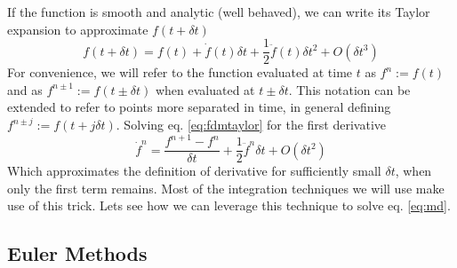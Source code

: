 \documentclass[ twoside,openright,titlepage,numbers=noenddot,%
headinclude,footinclude,cleardoublepage=empty,abstract=on,
BCOR=5mm,paper=a4,fontsize=11pt, dvipsnames
]{scrreprt}
\newcommand{\dt}{\delta t}
\newcommand{\half}{\frac{1}{2}}
\begin{document}
If the function is smooth and analytic (well behaved), we can write its Taylor expansion to approximate $f(t+\dt)$
\begin{equation}
  \label{eq:fdmtaylor}
  f(t+\dt) = f(t)+\dot{f}(t)\dt + \half\ddot{f}(t)\dt^2 + O(\dt^3)
\end{equation}
For convenience, we will refer to the function evaluated at time $t$ as $f^n := f(t)$ and as $f^{n\pm 1} := f(t\pm \dt)$ when evaluated at $t\pm \dt$. This notation can be extended to refer to points more separated in time, in general defining $f^{n\pm j} := f(t+j\dt)$.
Solving eq. \eqref{eq:fdmtaylor} for the first derivative
\begin{equation}
 \dot{f}^n  =  \frac{f^{n+1} - f^n}{\dt} + \half\ddot{f}^n\dt + O(\dt^2)
\end{equation}
Which approximates the definition of derivative for sufficiently small $\dt$, when only the first term remains.
Most of the integration techniques we will use make use of this trick.
Lets see how we can leverage this technique to solve eq. \eqref{eq:md}.
\subsection{Euler Methods}\label{sec:euler}
\end{document}
